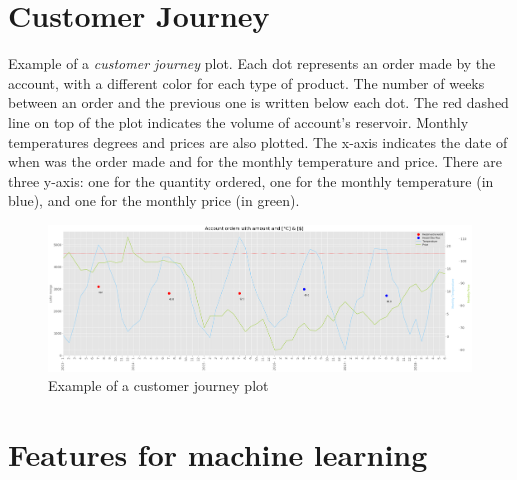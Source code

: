 \appendix

\chapter{Customer Journey}

Example of a \textit{customer journey} plot. Each dot represents an order made by the account, with a different color for each type of product. The number of weeks between an order and the previous one is written below each dot. The red dashed line on top of the plot indicates the volume of account's reservoir. Monthly temperatures degrees and prices are also plotted. The x-axis indicates the date of when was the order made and for the monthly temperature and price. There are three y-axis: one for the quantity ordered, one for the monthly temperature (in blue), and one for the monthly price (in green). \\

\begin{figure}[htbp]
    \centering
    \hspace*{-1cm}
    \includegraphics[width=17cm]{images/customer-journey.png}
    \caption{Example of a customer journey plot}
    \label{fig-annex:customer-journey}
\end{figure}


\chapter{Features for machine learning}
\label{annex:features-for-ml}

